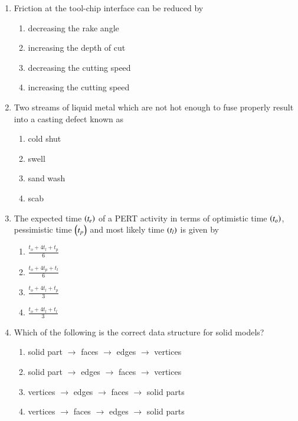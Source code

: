 \documentclass[journal]{IEEEtran}
\begin{document}
\begin{enumerate}
    \item Friction at the tool-chip interface can be reduced by
    \begin{multicols}{2}
    \begin{enumerate}
        \item decreasing the rake angle
        \item increasing the depth of cut
        \item decreasing the cutting speed
        \item increasing the cutting speed
    \end{enumerate}
    \end{multicols}

    \item Two streams of liquid metal which are not hot enough to fuse properly
    result into a casting defect known as
    \begin{multicols}{4}
    \begin{enumerate}
        \item cold shut
        \item swell
        \item sand wash
        \item scab
    \end{enumerate}
    \end{multicols}

    \item The expected time $\left(t_e\right)$ of a PERT activity in terms of optimistic time
    $\left(t_o\right)$, pessimistic time $\left(t_p\right)$ and most likely time $\left(t_l\right)$
    is given by
    \begin{multicols}{2}
    \begin{enumerate}
        \item $\frac{t_o + 4t_l + t_p}{6}$
        \item $\frac{t_o + 4t_p + t_l}{6}$
        \item $\frac{t_o + 4t_l + t_p}{3}$
        \item $\frac{t_o + 4t_l + t_l}{3}$
    \end{enumerate}
    \end{multicols}

    \item Which of the following is the correct data structure for solid models?
    \begin{enumerate}
        \item solid part $\rightarrow$ faces $\rightarrow$ edges $\rightarrow$ vertices
        \item solid part $\rightarrow$ edges $\rightarrow$ faces $\rightarrow$ vertices
        \item vertices $\rightarrow$ edges $\rightarrow$ faces $\rightarrow$ solid parts
        \item vertices $\rightarrow$ faces $\rightarrow$ edges $\rightarrow$ solid parts
    \end{enumerate}


\end{enumerate}
\end{document}
